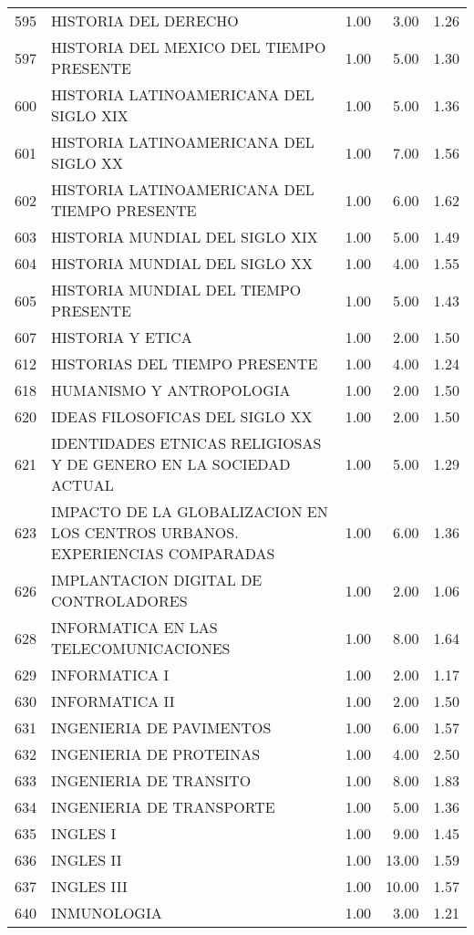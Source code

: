 \documentclass[12pt]{article}
\begin{document}
\begin{table}[ht]
\begin{tabular}{rlrrr}
  595 & HISTORIA DEL DERECHO & 1.00 & 3.00 & 1.26 \\ 
  597 & HISTORIA DEL MEXICO DEL TIEMPO PRESENTE & 1.00 & 5.00 & 1.30 \\ 
  600 & HISTORIA LATINOAMERICANA DEL SIGLO XIX & 1.00 & 5.00 & 1.36 \\ 
  601 & HISTORIA LATINOAMERICANA DEL SIGLO XX & 1.00 & 7.00 & 1.56 \\ 
  602 & HISTORIA LATINOAMERICANA DEL TIEMPO PRESENTE & 1.00 & 6.00 & 1.62 \\ 
  603 & HISTORIA MUNDIAL DEL SIGLO XIX & 1.00 & 5.00 & 1.49 \\ 
  604 & HISTORIA MUNDIAL DEL SIGLO XX & 1.00 & 4.00 & 1.55 \\ 
  605 & HISTORIA MUNDIAL DEL TIEMPO PRESENTE & 1.00 & 5.00 & 1.43 \\ 
  607 & HISTORIA Y ETICA & 1.00 & 2.00 & 1.50 \\ 
  612 & HISTORIAS DEL TIEMPO PRESENTE & 1.00 & 4.00 & 1.24 \\ 
  618 & HUMANISMO Y ANTROPOLOGIA & 1.00 & 2.00 & 1.50 \\ 
  620 & IDEAS FILOSOFICAS DEL SIGLO XX & 1.00 & 2.00 & 1.50 \\ 
  621 & IDENTIDADES ETNICAS RELIGIOSAS Y DE GENERO EN LA SOCIEDAD ACTUAL & 1.00 & 5.00 & 1.29 \\ 
  623 & IMPACTO DE LA GLOBALIZACION EN LOS CENTROS URBANOS. EXPERIENCIAS COMPARADAS & 1.00 & 6.00 & 1.36 \\ 
  626 & IMPLANTACION DIGITAL DE CONTROLADORES & 1.00 & 2.00 & 1.06 \\ 
  628 & INFORMATICA EN LAS TELECOMUNICACIONES & 1.00 & 8.00 & 1.64 \\ 
  629 & INFORMATICA I & 1.00 & 2.00 & 1.17 \\ 
  630 & INFORMATICA II & 1.00 & 2.00 & 1.50 \\ 
  631 & INGENIERIA DE PAVIMENTOS & 1.00 & 6.00 & 1.57 \\ 
  632 & INGENIERIA DE PROTEINAS & 1.00 & 4.00 & 2.50 \\ 
  633 & INGENIERIA DE TRANSITO & 1.00 & 8.00 & 1.83 \\ 
  634 & INGENIERIA DE TRANSPORTE & 1.00 & 5.00 & 1.36 \\ 
  635 & INGLES I & 1.00 & 9.00 & 1.45 \\ 
  636 & INGLES II & 1.00 & 13.00 & 1.59 \\ 
  637 & INGLES III & 1.00 & 10.00 & 1.57 \\ 
  640 & INMUNOLOGIA & 1.00 & 3.00 & 1.21 \\ 

\end{tabular}
\end{table}
\end{document}
